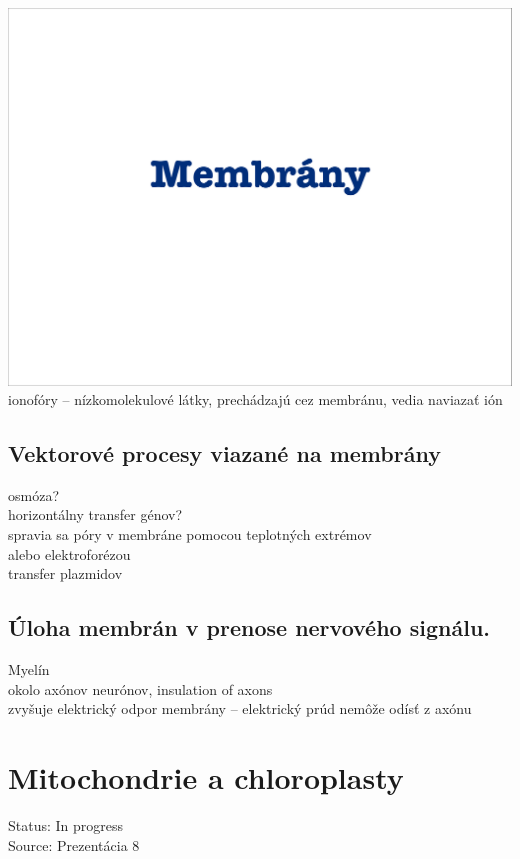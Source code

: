 \includegraphics[width=1\textwidth, page=32]{materials/Bunkova_biologia/prednasky_zaklady_bunkovej_biologie/07_ZBB07-Membrany.pdf}\\
ionofóry -- nízkomolekulové látky, prechádzajú cez membránu, vedia naviazať ión\\
\subsection{Vektorové procesy viazané na membrány}
osmóza?\\
horizontálny transfer génov?\\
\tab spravia sa póry v membráne pomocou teplotných extrémov\\
\tab alebo elektroforézou\\
\tab transfer plazmidov\\
\subsection{Úloha membrán v prenose nervového signálu.}
Myelín \\
\tab okolo axónov neurónov, insulation of axons\\
\tab zvyšuje elektrický odpor membrány -- elektrický prúd nemôže odísť z axónu\\

\section{Mitochondrie a chloroplasty}

Status: In progress\\
Source: Prezentácia 8\\

